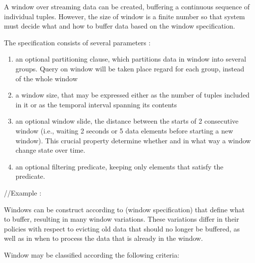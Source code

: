 A window over streaming data can be created, buffering a continuous sequence of individual tuples. However, the size of window is a finite number so that system must decide what and how to buffer data based on the window specification. 

The specification consists of several parameters :
\begin{enumerate}
\item an optional partitioning clause, which partitions data in window into several groups. Query on window will be taken place regard for each group, instead of the whole window
\item a window size, that may be expressed either as the number of tuples included in it or as the temporal interval spanning its contents
\item an optional window slide, the distance between the starts of 2 consecutive window (i.e., waiting 2 seconds or 5 data elements before starting a new window). This crucial property determine whether and in what way a window change state over time.
\item an optional filtering predicate, keeping only elements that satisfy the predicate.
\end{enumerate}

//Example : 


Windows can be construct according to (window specification) that define what to buffer, resulting in many window variations. These variations differ in their policies with respect to evicting old data that should no longer be buffered, as well as in when to process the data that is already in the window.\citep{Henrique:2014}



Window may be classified according the following criteria:

